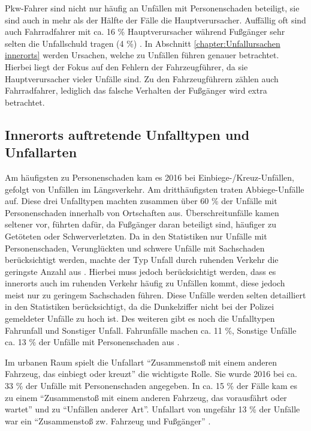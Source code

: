 Pkw-Fahrer sind nicht nur häufig an Unfällen mit Personenschaden beteiligt, sie sind auch in mehr als der Hälfte der Fälle die Hauptverursacher. Auffällig oft sind auch Fahrradfahrer mit ca. 16 \% Hauptverursacher während Fußgänger sehr selten die Unfallschuld tragen (4 \%) \parencite[S. 105]{StatistischesBundesamt.2018c}. In Abschnitt \ref{chapter:Unfallursachen innerorts} werden Ursachen, welche zu Unfällen führen genauer betrachtet. Hierbei liegt der Fokus auf den Fehlern der Fahrzeugführer, da sie Hauptverursacher vieler Unfälle sind. Zu den Fahrzeugführern zählen auch Fahrradfahrer, lediglich das falsche Verhalten der Fußgänger wird extra betrachtet.

\subsection{Innerorts auftretende Unfalltypen und Unfallarten }
Am häufigsten zu Personenschaden kam es 2016 bei Einbiege-/Kreuz-Unfällen, gefolgt von Unfällen im Längsverkehr. Am dritthäufigsten traten Abbiege-Unfälle auf. Diese drei Unfalltypen machten zusammen über 60 \% der Unfälle mit Personenschaden innerhalb von Ortschaften aus. Überschreitunfälle kamen seltener vor, führten dafür, da Fußgänger daran beteiligt sind, häufiger zu Getöteten oder Schwerverletzten. Da in den Statistiken nur Unfälle mit Personenschaden, Verunglückten und schwere Unfälle mit Sachschaden berücksichtigt werden, machte der Typ Unfall durch ruhenden Verkehr die geringste Anzahl aus \parencite[S. 68]{StatistischesBundesamt.2017}. Hierbei muss jedoch berücksichtigt werden, dass es innerorts auch im ruhenden Verkehr häufig zu Unfällen kommt, diese jedoch meist nur zu geringem Sachschaden führen. Diese Unfälle werden selten detailliert in den Statistiken berücksichtigt, da die Dunkelziffer nicht bei der Polizei gemeldeter Unfälle zu hoch ist. Des weiteren gibt es noch die Unfalltypen Fahrunfall und Sonstiger Unfall. Fahrunfälle machen ca. 11 \%, Sonstige Unfälle ca. 13 \% der Unfälle mit Personenschaden aus \parencite[S. 68]{StatistischesBundesamt.2017}.

Im urbanen Raum spielt die Unfallart \enquote{Zusammenstoß mit einem anderen Fahrzeug, das einbiegt oder kreuzt} die wichtigste Rolle. Sie wurde 2016 bei ca. 33 \% der Unfälle mit Personenschaden angegeben. In ca. 15 \% der Fälle kam es zu einem \enquote{Zusammenstoß mit einem anderen Fahrzeug, das vorausfährt oder wartet} und zu \enquote{Unfällen anderer Art}. Unfallart von ungefähr 13 \% der Unfälle war ein \enquote{Zusammenstoß zw. Fahrzeug und Fußgänger} \parencite[S. 74]{StatistischesBundesamt.2017}.

